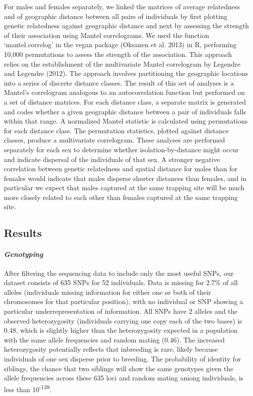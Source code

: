 \documentclass[
]{article}
\begin{document}
For males and females separately, we linked the matrices of average
relatedness and of geographic distance between all pairs of individuals
by first plotting genetic relatedness against geographic distance and
next by assessing the strength of their association using Mantel
correlograms. We used the function `mantel.correlog' in the vegan
package (Oksanen et al. 2013) in R, performing 10,000 permutations to
assess the strength of the association. This approach relies on the
establishment of the multivariate Mantel correlogram by Legendre and
Legendre (2012). The approach involves partitioning the geographic
locations into a series of discrete distance classes. The result of this
set of analyses is a Mantel's correlogram analogous to an
autocorrelation function but performed on a set of distance matrices.
For each distance class, a separate matrix is generated and codes
whether a given geographic distance between a pair of individuals falls
within that range. A normalized Mantel statistic is calculated using
permutations for each distance class. The permutation statistics,
plotted against distance classes, produce a multivariate correlogram.
These analyses are performed separately for each sex to determine
whether isolation-by-distance might occur and indicate dispersal of the
individuals of that sex. A stronger negative correlation between genetic
relatedness and spatial distance for males than for females would
indicate that males disperse shorter distances than females, and in
particular we expect that males captured at the same trapping site will
be much more closely related to each other than females captured at the
same trapping site.

\newpage

\hypertarget{results}{%
\subsection{Results}\label{results}}

\hypertarget{genotyping}{%
\paragraph{\texorpdfstring{\emph{Genotyping}}{Genotyping}}\label{genotyping}}

After filtering the sequencing data to include only the most useful
SNPs, our dataset consists of 635 SNPs for 52 individuals. Data is
missing for 2.7\% of all alleles (individuals missing information for
either one or both of their chromosomes for that particular position),
with no individual or SNP showing a particular underrepresentation of
information. All SNPs have 2 alleles and the observed heterozygosity
(individuals carrying one copy each of the two bases) is 0.48, which is
slightly higher than the heterozygosity expected in a population with
the same allele frequencies and random mating (0.46). The increased
heterozygosity potentially reflects that inbreeding is rare, likely
because individuals of one sex disperse prior to breeding. The
probability of identity for siblings, the chance that two siblings will
show the same genotypes given the allele frequencies across these 635
loci and random mating among individuals, is less than
10\textsuperscript{-139}.
\end{document}
